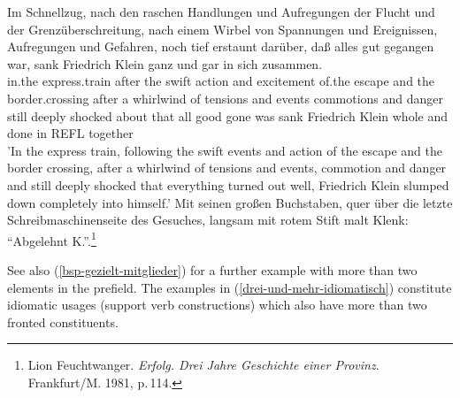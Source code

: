 \eal
\ex
\gll Im Schnellzug, nach den raschen Handlungen und Aufregungen der Flucht und der 
      Grenzüberschreitung, nach einem Wirbel von Spannungen und Ereignissen, Aufregungen
      und Gefahren, noch tief erstaunt darüber, daß alles gut gegangen war, sank Friedrich
      Klein ganz und gar in sich zusammen.\footnotemark\\
      in.the express.train after the swift action and excitement of.the escape and the border.crossing after a whirlwind of
tensions and events commotions and danger still deeply shocked about that all good gone was sank Friedrich Klein whole and done
in REFL together\\
\glt 'In the express train, following the swift events and action of the escape and the border crossing, after a whirlwind of tensions and events, commotion and danger and still deeply shocked that everything turned out well, Friedrich Klein slumped down completely into himself.'
\ex Mit seinen großen Buchstaben, quer über die letzte Schreibmaschinenseite des Gesuches,
      langsam mit rotem Stift malt Klenk: "`Abgelehnt K."'.\footnote{
        Lion Feuchtwanger. \emph{Erfolg. Drei Jahre Geschichte einer Provinz}. Frankfurt/M. 1981, p.\,114.
}
\zl

See also (\ref{bsp-gezielt-mitglieder}) for a further example with more than two elements in the prefield. The examples in
(\ref{drei-und-mehr-idiomatisch}) constitute idiomatic usages (support verb constructions) which also have more than two fronted
constituents.

